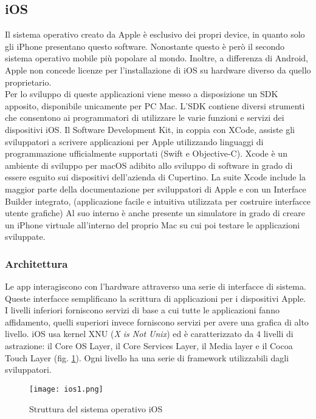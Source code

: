 \subsection{iOS}
Il sistema operativo creato da Apple è esclusivo dei propri device, in quanto
solo gli iPhone presentano questo software. Nonostante questo è però il secondo
sistema operativo mobile più popolare al mondo. Inoltre, a differenza di Android, Apple
non concede licenze per l’installazione di iOS su hardware diverso da quello
proprietario. \\
Per lo sviluppo di queste applicazioni viene messo a disposizione un SDK apposito,
disponibile unicamente per PC Mac. L’SDK contiene diversi strumenti che
consentono ai programmatori di utilizzare le varie funzioni e servizi dei
dispositivi iOS. Il Software Development Kit, in coppia con XCode, assiste gli
sviluppatori a scrivere
applicazioni per Apple utilizzando linguaggi di programmazione ufficialmente
supportati (Swift
e Objective-C). Xcode è un ambiente di sviluppo per macOS adibito allo sviluppo
di software in grado di essere esguito sui dispositivi dell'azienda di
Cupertino. La suite Xcode include la maggior parte
della documentazione per sviluppatori di Apple e con un Interface Builder integrato,
(applicazione facile e intuitiva utilizzata per costruire interfacce utente
grafiche) Al suo interno è anche presente un simulatore in grado di creare un
iPhone virtuale all'interno del proprio Mac su cui poi testare le applicazioni
sviluppate.
\subsubsection{Architettura}
Le app interagiscono con l’hardware attraverso una serie di interfacce di
sistema. Queste interfacce semplificano la scrittura di applicazioni per i
dispositivi Apple. I livelli inferiori forniscono servizi di base a cui tutte le
applicazioni fanno affidamento, quelli superiori invece forniscono servizi
per avere una grafica di alto livello. iOS usa kernel XNU (\textit{X is Not
Unix}) ed è caratterizzato da
4 livelli di astrazione: il Core OS Layer, il Core Services Layer, il Media layer e
il Cocoa Touch Layer (fig. \ref{ios1}). Ogni livello ha una serie di framework
utilizzabili dagli sviluppatori. 
\begin{figure}[!h]
    \centering
    \texttt{[image: ios1.png]}
    \caption{Struttura del sistema operativo iOS}
    \label{ios1}
\end{figure}

